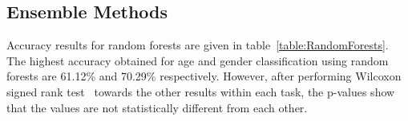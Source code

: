 \documentclass[a4paper]{llncs}
\begin{document}
%


\subsection{Ensemble Methods}
Accuracy results for random forests are given in table~\ref{table:RandomForests}. The highest accuracy obtained for age and gender classification using random forests are 61.12\% and 70.29\% respectively. However, after performing Wilcoxon signed rank test~\cite{wilcoxon1945individual} towards the other results within each task, the p-values show that the values are not statistically different from each other.  
\end{document}
